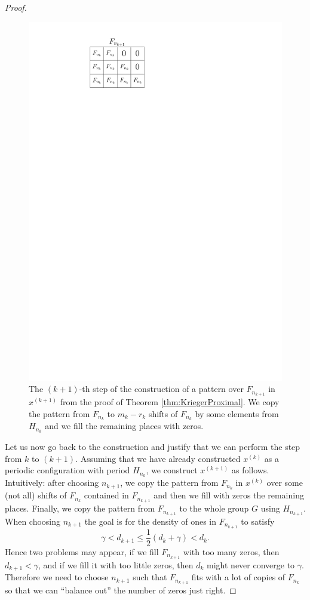 \begin{proof}
\begin{figure}
\centering
\includegraphics[scale=1.3]{Graphics/obrazek_prox.pdf}
\caption{The $(k+1)$-th step of the construction of a pattern over $F_{n_{k+1}}$ in $x^{(k+1)}$ from the proof of Theorem \ref{thm:KriegerProximal}. We copy the pattern from $F_{n_k}$ to $m_k-r_k$ shifts of $F_{n_k}$ by some elements from $H_{n_k}$ and we fill the remaining places with zeros.}\label{fig:constr_prox}
\end{figure}


Let us now go back to the construction and justify that we can perform the step from $k$ to $(k+1)$.
%
Assuming that we have already constructed $x^{(k)}$ as a periodic configuration with period $H_{n_k}$, we construct $x^{(k+1)}$ as follows.
%
Intuitively: after choosing $n_{k+1}$, we copy the pattern from $F_{n_k}$ in $x^{(k)}$ over some (not all) shifts of $F_{n_k}$ contained in $F_{n_{k+1}}$ and then we fill with zeros the remaining places.
%
Finally, we copy the pattern from $F_{n_{k+1}}$ to the whole group $G$ using $H_{n_{k+1}}$.
%
When choosing  ${n_{k+1}}$ the goal is for the density of ones in $F_{n_{k+1}}$ to satisfy 
\[
\gamma<d_{k+1}\leq\frac{1}{2}(d_k+\gamma)<d_k .
\]
Hence two problems may appear, if we fill $F_{n_{k+1}}$ with too many zeros, then $d_{k+1}<\gamma$, and if we fill it with too little zeros, then $d_k$ might never converge to $\gamma$. Therefore we need to choose $n_{k+1}$ such that $F_{n_{k+1}}$ fits with a lot of copies of $F_{n_k}$ so that we can ``balance out'' the number of zeros just right.



\end{proof}
